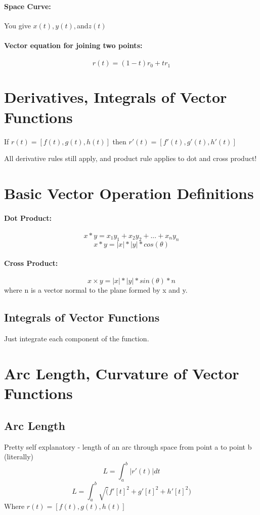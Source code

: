 \documentclass[a4paper,12pt]{report}
\begin{document}
\paragraph{Space Curve: } You give $x(t), y(t), $and$ z(t)$ 

\paragraph{Vector equation for joining two points: } $$r(t) = (1-t)r_0 + tr_1$$

\section{Derivatives, Integrals of Vector Functions}
If $r(t) = [f(t), g(t), h(t)]$ then $r'(t) = [f'(t), g'(t), h'(t)]$

All derivative rules still apply, and product rule applies to dot and cross product!

\section{Basic Vector Operation Definitions}
\paragraph{Dot Product: } $$x * y = x_1y_1+x_2y_2+ ... + x_ny_n$$
$$x * y = |x|*|y|*cos(\theta)$$
\paragraph{Cross Product: } $$x \times y = |x|*|y|*sin(\theta) * n$$ where n is a vector normal to the plane formed by x and y.

\subsection{Integrals of Vector Functions}
Just integrate each component of the function.

\section{Arc Length, Curvature of Vector Functions}
\subsection{Arc Length}
Pretty self explanatory - length of an arc through space from point a to point b (literally)
$$L = \int_a^b |r'(t)|dt$$
$$L = \int_a^b \sqrt(f'[t]^2 + g'[t]^2 + h'[t]^2)$$
Where $r(t) = [f(t), g(t), h(t)]$
\end{document}

